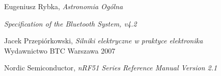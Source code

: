 \begin{thebibliography}{9}

 Eugeniusz Rybka, \emph{Astronomia Ogólna}

 \emph{Specification of the Bluetooth System, v4.2}
	
 Jacek Przepiórkowski, \emph{Silniki elektryczne
	w praktyce elektronika} \\ Wydawnictwo BTC Warszawa 2007

 Nordic Semiconductor, \emph{nRF51 Series Reference Manual
	Version 2.1}

\end{thebibliography}
